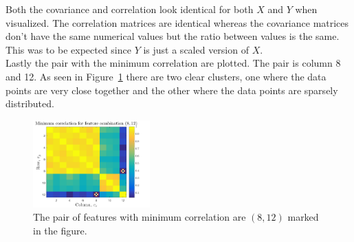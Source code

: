 \documentclass{article}
\begin{document}
\noindent Both the covariance and correlation look identical for both $X$ and $Y$ when visualized. The correlation matrices are identical whereas the covariance matrices don't have the same numerical values but the ratio between values is the same. This was to be expected since $Y$ is just a scaled version of $X$.\\
Lastly the pair with the minimum correlation are plotted. The pair is column 8 and 12. As seen in Figure~\ref{fig:scatter} there are two clear clusters, one where the data points are very close together and the other where the data points are sparsely distributed.

\begin{figure}[H]
    \centering
    \includegraphics[width=0.4\textwidth]{Figures/plot2_2_corr_y_scatter.png}
    \caption{The pair of features with minimum correlation are $(8,12)$ marked in the figure. }
    \label{fig:scatter}
\end{figure}
\end{document}
